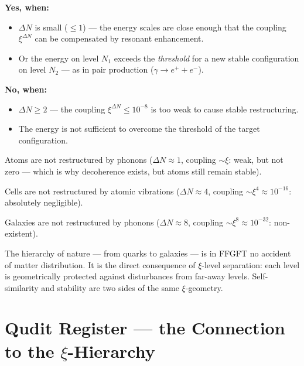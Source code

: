 \textbf{Yes, when:}
\begin{itemize}
  \item $\Delta N$ is small ($\leq 1$) --- the energy scales
    are close enough that the coupling $\xi^{\Delta N}$
    can be compensated by resonant enhancement.
  \item Or the energy on level $N_1$ exceeds the
    \emph{threshold} for a new stable configuration
    on level $N_2$ ---
    as in pair production ($\gamma \to e^+ + e^-$).
\end{itemize}

\textbf{No, when:}
\begin{itemize}
  \item $\Delta N \geq 2$ --- the coupling
    $\xi^{\Delta N} \leq 10^{-8}$ is too weak
    to cause stable restructuring.
  \item The energy is not sufficient to overcome the threshold
    of the target configuration.
\end{itemize}

\begin{keypoint}
Atoms are not restructured by phonons
($\Delta N \approx 1$, coupling $\sim \xi$: weak,
but not zero --- which is why decoherence exists,
but atoms still remain stable).

Cells are not restructured by atomic vibrations
($\Delta N \approx 4$,
coupling $\sim \xi^4 \approx 10^{-16}$:
absolutely negligible).

Galaxies are not restructured by phonons
($\Delta N \approx 8$,
coupling $\sim \xi^8 \approx 10^{-32}$:
non-existent).

The hierarchy of nature --- from quarks to galaxies ---
is in FFGFT no accident of matter distribution.
It is the direct consequence of $\xi$-level separation:
each level is geometrically protected against
disturbances from far-away levels.
Self-similarity and stability are
two sides of the same $\xi$-geometry.
\end{keypoint}


\section{Qudit Register --- the Connection to the \texorpdfstring{$\xi$}{xi}-Hierarchy}
\label{sec:qudit-register}

